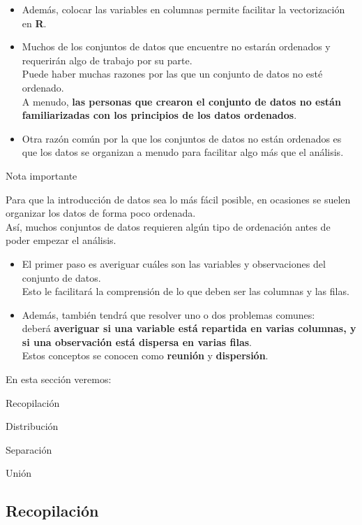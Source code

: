 \documentclass[
]{book}
\begin{document}
\begin{itemize}
\item
  Además, colocar las variables en columnas permite facilitar la vectorización en \textbf{R}.
\item
  Muchos de los conjuntos de datos que encuentre no estarán ordenados y requerirán algo de trabajo por su parte.\\
  Puede haber muchas razones por las que un conjunto de datos no esté ordenado.\\
  A menudo, \textbf{las personas que crearon el conjunto de datos no están familiarizadas con los principios de los datos ordenados}.
\item
  Otra razón común por la que los conjuntos de datos no están ordenados es que los datos se organizan a menudo para facilitar algo más que el análisis.
\end{itemize}

{} Nota importante

Para que la introducción de datos sea lo más fácil posible, en ocasiones se suelen organizar los datos de forma poco ordenada.\\
Así, muchos conjuntos de datos requieren algún tipo de ordenación antes de poder empezar el análisis.

\begin{itemize}
\item
  El primer paso es averiguar cuáles son las variables y observaciones del conjunto de datos.\\
  Esto le facilitará la comprensión de lo que deben ser las columnas y las filas.
\item
  Además, también tendrá que resolver uno o dos problemas comunes:\\
  deberá \textbf{averiguar si una variable está repartida en varias columnas, y si una observación está dispersa en varias filas}.\\
  Estos conceptos se conocen como \textbf{reunión} y \textbf{dispersión}.
\end{itemize}

{} En esta sección veremos:

Recopilación

Distribución

Separación

Unión

\subsection{Recopilación}\label{recopilaciuxf3n}
\end{document}
